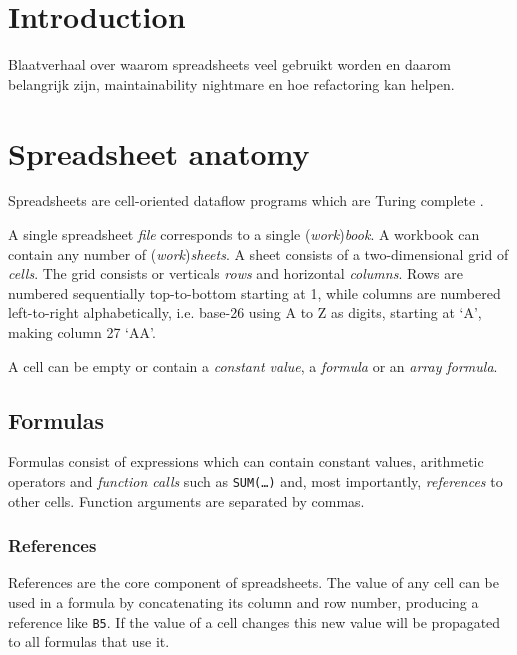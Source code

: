 \documentclass[12pt,a4paper,onecolumn,oneside]{memoir}
\begin{document}


\cleardoublepage

\tableofcontents*

\clearpage


\chapter{Introduction}
Blaatverhaal over waarom spreadsheets veel gebruikt worden en daarom belangrijk zijn, maintainability nightmare en hoe refactoring kan helpen.

\chapter{Spreadsheet anatomy}

Spreadsheets are cell-oriented dataflow programs which are Turing complete \cite{ExcelTuringComplete}.

A single spreadsheet \emph{file} corresponds to a single (\emph{work})\emph{book}.
A workbook can contain any number of (\emph{work})\emph{sheets}.
A sheet consists of a two-dimensional grid of \emph{cells}.
The grid consists or verticals \emph{rows} and horizontal \emph{columns}.
Rows are numbered sequentially top-to-bottom starting at 1, while columns are numbered left-to-right alphabetically, i.e. base-26 using A to Z as digits, starting at `A', making column 27 `AA'.

A cell can be empty or contain a \emph{constant value}, a \emph{formula} or an \emph{array formula}.

\section{Formulas}

Formulas consist of expressions which can contain constant values, arithmetic operators and \emph{function calls} such as \texttt{SUM(\ldots)} and, most importantly, \emph{references} to other cells.
Function arguments are separated by commas.

\subsection{References}
References are the core component of spreadsheets.
The value of any cell can be used in a formula by concatenating its column and row number, producing a reference like \texttt{B5}.
If the value of a cell changes this new value will be propagated to all formulas that use it.
\end{document}
